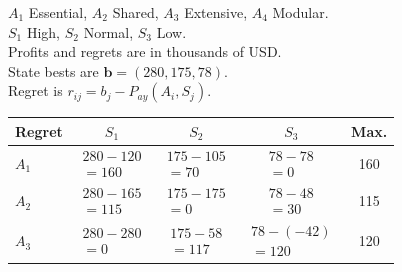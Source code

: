{\noindent\begin{minipage}[t]{0.46\textwidth}
  \vspace{0pt}
  $A_1$ Essential, $A_2$ Shared, $A_3$ Extensive, $A_4$ Modular.\\
  $S_1$ High, $S_2$ Normal, $S_3$ Low.\\
  Profits and regrets are in thousands of USD.\\
  State bests are $\boldsymbol{b}=(280,175,78)$.\\
  Regret is $r_{ij}=b_j-P_{ay}(A_i,S_j)$.
\end{minipage}\hfill
\begin{minipage}[t]{0.51\textwidth}
  \vspace{0pt}\centering
  \setlength{\tabcolsep}{3pt}
  \renewcommand{\arraystretch}{1.2}
  \begin{tabular}{@{}lcccc@{}}
    \toprule
    Regret & $S_1$ & $S_2$ & $S_3$ & Max.\\ \midrule
    $A_1$ & $\begin{gathered}280-120\\=160\end{gathered}$ & $\begin{gathered}175-105\\=70\end{gathered}$ & $\begin{gathered}78-78\\=0\end{gathered}$ & 160\\
    $A_2$ & $\begin{gathered}280-165\\=115\end{gathered}$ & $\begin{gathered}175-175\\=0\end{gathered}$ & $\begin{gathered}78-48\\=30\end{gathered}$ & 115\\
    $A_3$ & $\begin{gathered}280-280\\=0\end{gathered}$ & $\begin{gathered}175-58\\=117\end{gathered}$ & $\begin{gathered}78-(-42)\\=120\end{gathered}$ & 120\\

\end{tabular}
\end{minipage}}
